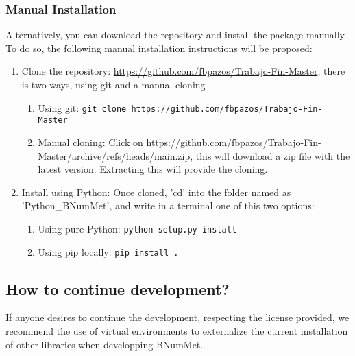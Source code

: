 \subsubsection{Manual Installation}
Alternatively, you can download the repository and install the package manually. To do so, the following manual installation instructions will be proposed:
\begin{enumerate}
    \item Clone the repository: \href{https://github.com/fbpazos/Trabajo-Fin-Master}{https://github.com/fbpazos/Trabajo-Fin-Master}, there is two ways, using git and a manual cloning
    \begin{enumerate}
        \item Using git: \lstinline|git clone https://github.com/fbpazos/Trabajo-Fin-Master|
        
        \item Manual cloning: Click on \href{https://github.com/fbpazos/Trabajo-Fin-Master/archive/refs/heads/main.zip}{https://github.com/fbpazos/Trabajo-Fin-Master/archive/refs/heads/main.zip}, this will download a zip file with the latest version. Extracting this will provide the cloning.
    \end{enumerate}

    \item Install using Python: Once cloned, 'cd' into the folder named as 'Python\_BNumMet', and write in a terminal one of this two options:
    \begin{enumerate}
        \item Using pure Python: \lstinline|python setup.py install|
        \item Using pip locally: \lstinline|pip install .|
    \end{enumerate}
    
\end{enumerate}


\subsection{How to continue development?}
If anyone desires to continue the development, respecting the license provided, we recommend the use of virtual environments to externalize the current installation of other libraries when developping BNumMet. 


